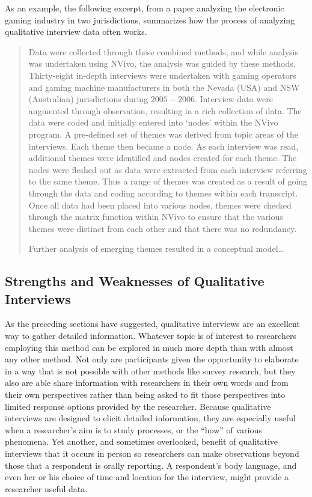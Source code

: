 As an example, the following excerpt, from a paper analyzing the electronic gaming industry in two jurisdictions\cite{buchanan2010efficacy}, summarizes how the process of analyzing qualitative interview data often works.

\begin{quote}
	Data were collected through these combined methods, and while analysis was undertaken using NVivo, the analysis was guided by these methods. Thirty-eight in-depth interviews were undertaken with gaming operators and gaming machine manufacturers in both the Nevada (USA) and NSW (Australian) jurisdictions during $ 2005-2006 $. Interview data were augmented through observation, resulting in a rich collection of data. The data were coded and initially entered into ‘nodes’ within the NVivo program. A pre-defined set of themes was derived from topic areas of the interviews. Each theme then became a node. As each interview was read, additional themes were identified and nodes created for each theme. The nodes were fleshed out as data were extracted from each interview referring to the same theme. Thus a range of themes was created as a result of going through the data and coding according to themes within each transcript. Once all data had been placed into various nodes, themes were checked through the matrix function within NVivo to ensure that the various themes were distinct from each other and that there was no redundancy. 
	
	Further analysis of emerging themes resulted in a conceptual model\ldots
\end{quote}

\subsection{Strengths and Weaknesses of Qualitative Interviews}

As the preceding sections have suggested, qualitative interviews are an excellent way to gather detailed information. Whatever topic is of interest to researchers employing this method can be explored in much more depth than with almost any other method. Not only are participants given the opportunity to elaborate in a way that is not possible with other methods like survey research, but they also are able share information with researchers in their own words and from their own perspectives rather than being asked to fit those perspectives into limited response options provided by the researcher. Because qualitative interviews are designed to elicit detailed information, they are especially useful when a researcher's aim is to study processes, or the ``how'' of various phenomena. Yet another, and sometimes overlooked, benefit of qualitative interviews that it occurs in person so researchers can make observations beyond those that a respondent is orally reporting. A respondent's body language, and even her or his choice of time and location for the interview, might provide a researcher useful data.

